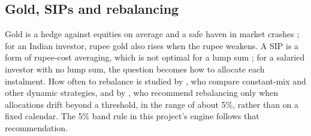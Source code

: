 \subsection{Gold, SIPs and rebalancing}

Gold is a hedge against equities on average and a safe haven in market crashes \citep{baur2010}; for an Indian investor, rupee gold also rises when the rupee weakens. 
A SIP is a form of rupee-cost averaging, which is not optimal for a lump sum \citep{constantinides1979,vanduffel2012}; for a salaried investor with no lump sum, the question becomes how to allocate each instalment. How often to rebalance is studied by \citet{perold1988}, who compare constant-mix and other dynamic
strategies, and by \citet{jaconetti2010}, who recommend rebalancing only when allocations drift
beyond a threshold, in the range of about 5\%, rather than on a fixed calendar. The 5\% band rule in
this project's engine follows that recommendation.

